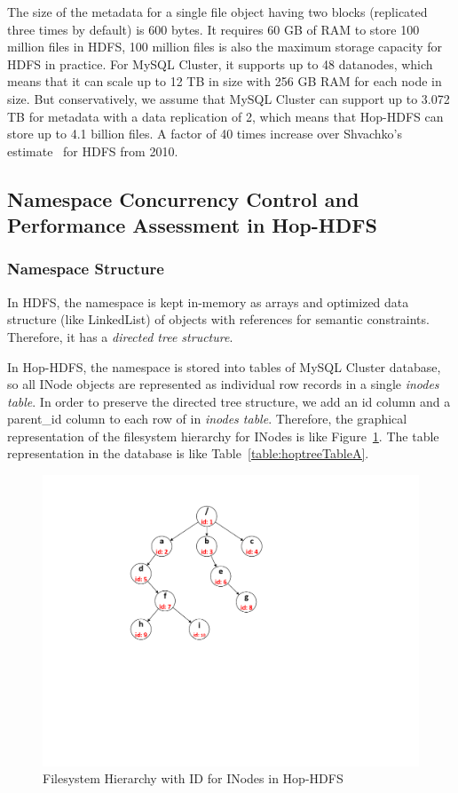 \documentclass[runningheads,a4paper]{llncs}
\begin{document}
The size of the metadata for a single file object having two blocks (replicated three times by default) is 600 bytes. It requires 60 GB of RAM to store 100 million files in HDFS, 100 million files is also the maximum storage capacity for HDFS in practice. For MySQL Cluster, it supports up to 48 datanodes, which means that it can scale up to 12 TB in size with 256 GB RAM for each node in size. But conservatively, we assume that MySQL Cluster can support up to 3.072 TB for metadata with a data replication of 2, which means that Hop-HDFS can store up to 4.1 billion files. A factor of 40 times increase over Shvachko's estimate~\cite{shvachko2010hdfs} for HDFS from 2010.

\subsection{Namespace Concurrency Control and Performance Assessment in Hop-HDFS}
\subsubsection{Namespace Structure}
In HDFS, the namespace is kept in-memory as arrays and optimized data structure (like LinkedList) of objects with references for semantic constraints. Therefore, it has a \textit{directed tree structure}.

In Hop-HDFS, the namespace is stored into tables of MySQL Cluster database, so all INode objects are represented as individual row records in a single \textit{inodes table}. In order to preserve the directed tree structure, we add an id column and a parent\_id column to each row of in \textit{inodes table}. Therefore, the graphical representation of the filesystem hierarchy for INodes is like Figure~\ref{fig:hoptreeA}. The table representation in the database is like Table~\ref{table:hoptreeTableA}.

\begin{figure}[h]
	\centering
	\includegraphics[scale=0.6]{hoptree.pdf}
	\caption{Filesystem Hierarchy with ID for INodes in Hop-HDFS}
	\label{fig:hoptreeA}
\end{figure}
\end{document}

